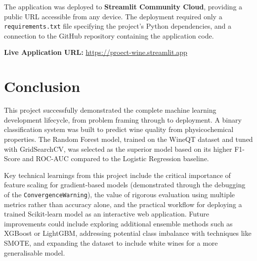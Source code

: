 \documentclass[11pt,a4paper]{article}
\begin{document}
The application was deployed to \textbf{Streamlit Community Cloud}, providing a public URL accessible from any device. The deployment required only a \texttt{requirements.txt} file specifying the project's Python dependencies, and a connection to the GitHub repository containing the application code.

\textbf{Live Application URL:} \url{https://proect-wine.streamlit.app}

\section{Conclusion}

This project successfully demonstrated the complete machine learning development lifecycle, from problem framing through to deployment. A binary classification system was built to predict wine quality from physicochemical properties. The Random Forest model, trained on the WineQT dataset and tuned with GridSearchCV, was selected as the superior model based on its higher F1-Score and ROC-AUC compared to the Logistic Regression baseline.

Key technical learnings from this project include the critical importance of feature scaling for gradient-based models (demonstrated through the debugging of the \texttt{ConvergenceWarning}), the value of rigorous evaluation using multiple metrics rather than accuracy alone, and the practical workflow for deploying a trained Scikit-learn model as an interactive web application. Future improvements could include exploring additional ensemble methods such as XGBoost or LightGBM, addressing potential class imbalance with techniques like SMOTE, and expanding the dataset to include white wines for a more generalisable model.
\end{document}
